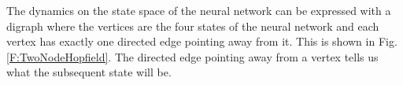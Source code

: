 %

   The dynamics on the state space of the neural network can be expressed with 
a digraph where the vertices are the four states of the neural network and each
vertex has exactly one directed edge pointing away from it.  This is shown in
Fig. \ref{F:TwoNodeHopfield}.  The directed edge pointing away from a vertex 
tells us what the subsequent state will be.

